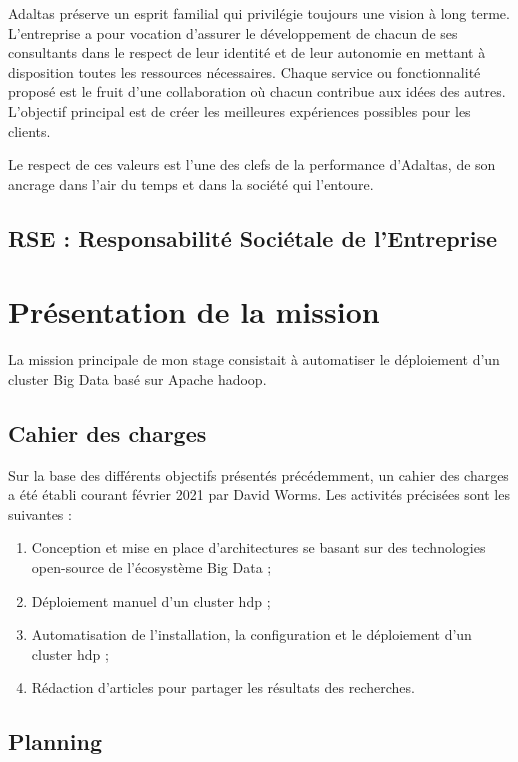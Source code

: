 \documentclass[12pt, french]{report}
\begin{document}
Adaltas préserve un esprit familial qui privilégie toujours une vision à long terme. L'entreprise a pour vocation d’assurer le développement de chacun de ses consultants dans le respect de leur identité et de leur autonomie en mettant à disposition toutes les ressources nécessaires. Chaque service ou fonctionnalité proposé est le fruit d’une collaboration où chacun contribue aux idées des autres. L'objectif principal est de créer les meilleures expériences possibles pour les clients.

Le respect de ces valeurs est l’une des clefs de la performance d'Adaltas, de son ancrage dans l’air du temps et dans la société qui l'entoure.

\section{RSE : Responsabilité Sociétale de l’Entreprise}



\chapter{Présentation de la mission}

La mission principale de mon stage consistait à automatiser le déploiement d'un cluster Big Data basé sur Apache \gls{hadoop}.

\section{Cahier des charges}

Sur la base des différents objectifs présentés précédemment, un cahier des charges a été établi courant février 2021 par David Worms. Les activités précisées sont les suivantes : 

\begin{enumerate}
  \item Conception et mise en place d’architectures se basant sur des technologies open-source de l'écosystème Big Data ;
  \item Déploiement manuel d'un cluster \gls{hdp} ;
  \item Automatisation de l'installation, la configuration et le déploiement d'un cluster \gls{hdp} ;
  \item Rédaction d’articles pour partager les résultats des recherches.
\end{enumerate}

\section{Planning}
\end{document}
